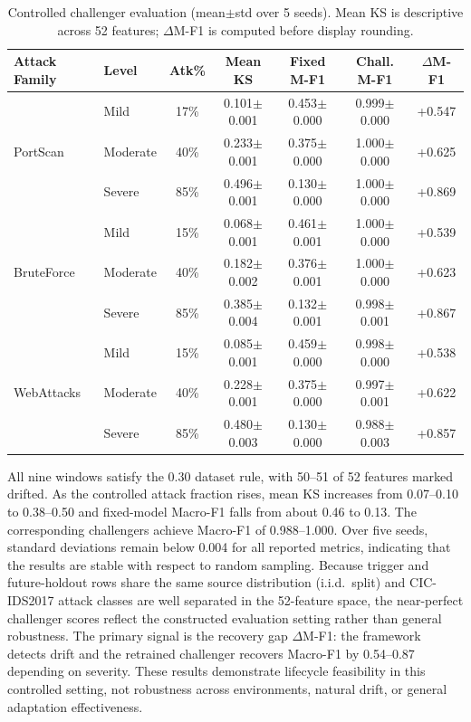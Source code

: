 \documentclass[runningheads]{llncs}
\begin{document}
\begin{table}[htbp]
\centering
\caption{Controlled challenger evaluation (mean$\pm$std over 5 seeds). Mean KS is descriptive across 52 features; $\Delta$M-F1 is computed before display rounding.}
\label{tab:drift-multilevel}
\scriptsize
\setlength{\tabcolsep}{3pt}
\begin{tabular}{@{}llccccc@{}}
\toprule
Attack Family & Level & Atk\% & Mean KS & Fixed M-F1 & Chall. M-F1 & $\Delta$M-F1 \\
\midrule
\multirow{3}{*}{PortScan}
  & Mild     & 17\% & 0.101$\pm$0.001 & 0.453$\pm$0.000 & 0.999$\pm$0.000 & +0.547 \\
  & Moderate & 40\% & 0.233$\pm$0.001 & 0.375$\pm$0.000 & 1.000$\pm$0.000 & +0.625 \\
  & Severe   & 85\% & 0.496$\pm$0.001 & 0.130$\pm$0.000 & 1.000$\pm$0.000 & +0.869 \\
\midrule
\multirow{3}{*}{BruteForce}
  & Mild     & 15\% & 0.068$\pm$0.001 & 0.461$\pm$0.001 & 1.000$\pm$0.000 & +0.539 \\
  & Moderate & 40\% & 0.182$\pm$0.002 & 0.376$\pm$0.001 & 1.000$\pm$0.000 & +0.623 \\
  & Severe   & 85\% & 0.385$\pm$0.004 & 0.132$\pm$0.001 & 0.998$\pm$0.001 & +0.867 \\
\midrule
\multirow{3}{*}{WebAttacks}
  & Mild     & 15\% & 0.085$\pm$0.001 & 0.459$\pm$0.000 & 0.998$\pm$0.000 & +0.538 \\
  & Moderate & 40\% & 0.228$\pm$0.001 & 0.375$\pm$0.000 & 0.997$\pm$0.001 & +0.622 \\
  & Severe   & 85\% & 0.480$\pm$0.003 & 0.130$\pm$0.000 & 0.988$\pm$0.003 & +0.857 \\
\bottomrule
\end{tabular}
\end{table}

All nine windows satisfy the $0.30$ dataset rule, with 50--51 of 52 features marked drifted. As the controlled attack fraction rises, mean KS increases from 0.07--0.10 to 0.38--0.50 and fixed-model Macro-F1 falls from about 0.46 to 0.13. The corresponding challengers achieve Macro-F1 of 0.988--1.000. Over five seeds, standard deviations remain below 0.004 for all reported metrics, indicating that the results are stable with respect to random sampling. Because trigger and future-holdout rows share the same source distribution (i.i.d.\ split) and CIC-IDS2017 attack classes are well separated in the 52-feature space, the near-perfect challenger scores reflect the constructed evaluation setting rather than general robustness. The primary signal is the recovery gap $\Delta$M-F1: the framework detects drift and the retrained challenger recovers Macro-F1 by 0.54--0.87 depending on severity. These results demonstrate lifecycle feasibility in this controlled setting, not robustness across environments, natural drift, or general adaptation effectiveness.
\end{document}

